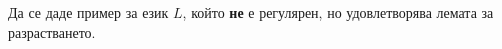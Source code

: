 \begin{problem}
  Да се даде пример за език $L$, който {\bf не} е регулярен, но удовлетворява
  лемата за разрастването.
\end{problem}



